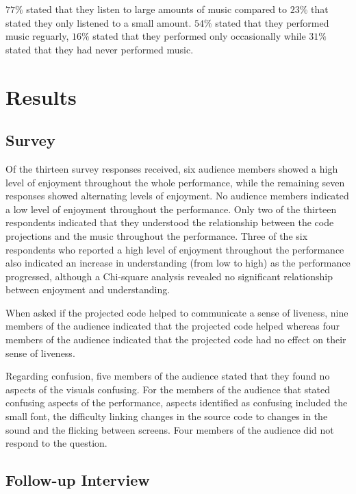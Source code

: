 $77\%$ stated that they listen to large amounts of music compared to $23\%$ that stated they only listened to a small amount. $54\%$ stated that they performed music reguarly, $16\%$ stated that they performed only occasionally while $31\%$ stated that they had never performed music.

\section{Results}

\subsection{Survey}

Of the thirteen survey responses received, six audience members showed a high level of enjoyment throughout the whole performance, while the remaining seven responses showed alternating levels of enjoyment. No audience members indicated a low level of enjoyment throughout the performance.  Only two of the thirteen respondents indicated that they understood the relationship between the code projections and the music throughout the performance. Three of the six respondents who reported a high level of enjoyment throughout the performance also indicated an increase in understanding (from low to high) as the performance progressed, although a Chi-square analysis revealed no significant relationship between enjoyment and understanding. 

When asked if the projected code helped to communicate a sense of liveness, nine members of the audience indicated that the projected code helped whereas four members of the audience indicated that the projected code had no effect on their sense of liveness.

Regarding confusion, five members of the audience stated that they found no aspects of the visuals confusing. For the members of the audience that stated confusing aspects of the performance, aspects identified as confusing included the small font, the difficulty linking changes in the source code to changes in the sound and the flicking between screens. Four members of the audience did not respond to the question.

\subsection{Follow-up Interview}
\label{section:study-1-follow-up-interview}

